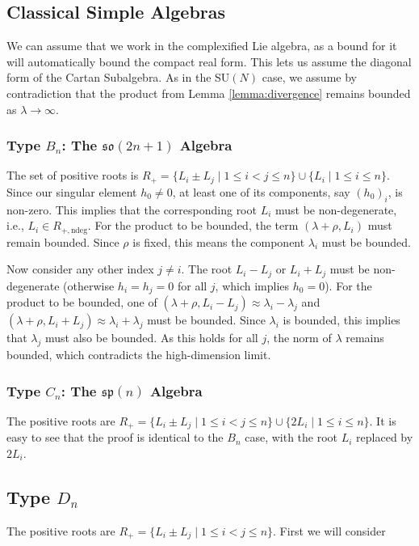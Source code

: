 \documentclass[11pt, a4paper]{article}
\theoremstyle{definition}
\theoremstyle{remark}
\begin{document}
\subsection{Classical Simple Algebras}

We can assume that we work in the complexified Lie algebra, as a bound for it will automatically bound the compact real form. This lets us assume the diagonal form of the Cartan Subalgebra. As in the SU$(N)$ case, we assume by contradiction that the product from Lemma \ref{lemma:divergence} remains bounded as $\lambda \to \infty$.

\subsubsection{Type $B_n$: The $\mathfrak{so}(2n+1)$ Algebra}
The set of positive roots is $R_+ = \{ L_i \pm L_j \mid 1 \le i < j \le n \} \cup \{ L_i \mid 1 \le i \le n \}$. Since our singular element $h_0 \neq 0$, at least one of its components, say $(h_0)_i$, is non-zero. This implies that the corresponding root $L_i$ must be non-degenerate, i.e., $L_i \in R_{+, \text{ndeg}}$. For the product to be bounded, the term $(\lambda+\rho, L_i)$ must remain bounded. Since $\rho$ is fixed, this means the component $\lambda_i$ must be bounded.

Now consider any other index $j \neq i$. The root $L_i-L_j$ or $L_i+L_j$ must be non-degenerate (otherwise $h_i = h_j = 0$ for all $j$, which implies $h_0=0$). For the product to be bounded, one of $(\lambda+\rho, L_i-L_j) \approx \lambda_i - \lambda_j$ and $(\lambda+\rho, L_i+L_j) \approx \lambda_i + \lambda_j$ must be bounded. Since $\lambda_i$ is bounded, this implies that $\lambda_j$ must also be bounded. As this holds for all $j$, the norm of $\lambda$ remains bounded, which contradicts the high-dimension limit.

\subsubsection{Type $C_n$: The $\mathfrak{sp}(n)$ Algebra}
The positive roots are $R_+ = \{ L_i \pm L_j \mid 1 \le i < j \le n \} \cup \{ 2L_i \mid 1 \le i \le n \}$. It is easy to see that the proof is identical to the $B_n$ case, with the root $L_i$ replaced by $2L_i$.

\subsection*{Type $D_n$}
The positive roots are $R_+ = \{ L_i \pm L_j \mid 1 \le i < j \le n \}$. First we will consider 
\end{document}
